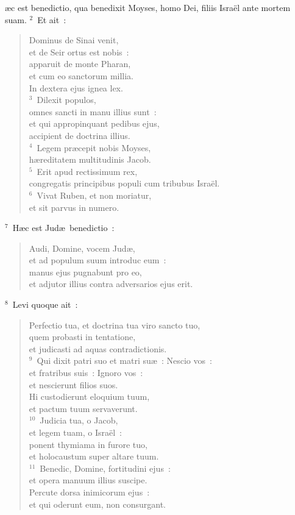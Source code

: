 \bchapter
{}\ae c est benedictio, qua benedixit Moyses, homo Dei, filiis Isra\"el ante mortem suam.
${}^{2}$~Et ait~: \begin{verse}Dominus de Sinai venit,\\ et de Seir ortus est nobis~:\\ apparuit de monte Pharan,\\ et cum eo sanctorum millia.\\ In dextera ejus ignea lex.\\
${}^{3}$~Dilexit populos,\\ omnes sancti in manu illius sunt~:\\ et qui appropinquant pedibus ejus,\\ accipient de doctrina illius.\\
${}^{4}$~Legem pr\ae cepit nobis Moyses,\\ h\ae reditatem multitudinis Jacob.\\
${}^{5}$~Erit apud rectissimum rex,\\ congregatis principibus populi cum tribubus Isra\"el.\\
${}^{6}$~Vivat Ruben, et non moriatur,\\ et sit parvus in numero.\end{verse}


${}^{7}$~H\ae c est Jud\ae\ benedictio~: \begin{verse}Audi, Domine, vocem Jud\ae ,\\ et ad populum suum introduc eum~:\\ manus ejus pugnabunt pro eo,\\ et adjutor illius contra adversarios ejus erit.\end{verse}


${}^{8}$~Levi quoque ait~: \begin{verse}Perfectio tua, et doctrina tua viro sancto tuo,\\ quem probasti in tentatione,\\ et judicasti ad aquas contradictionis.\\
${}^{9}$~Qui dixit patri suo et matri su\ae~: Nescio vos~:\\ et fratribus suis~: Ignoro vos~:\\ et nescierunt filios suos.\\ Hi custodierunt eloquium tuum,\\ et pactum tuum servaverunt.\\
${}^{10}$~Judicia tua, o Jacob,\\ et legem tuam, o Isra\"el~:\\ ponent thymiama in furore tuo,\\ et holocaustum super altare tuum.\\
${}^{11}$~Benedic, Domine, fortitudini ejus~:\\ et opera manuum illius suscipe.\\ Percute dorsa inimicorum ejus~:\\ et qui oderunt eum, non consurgant.\end{verse}


